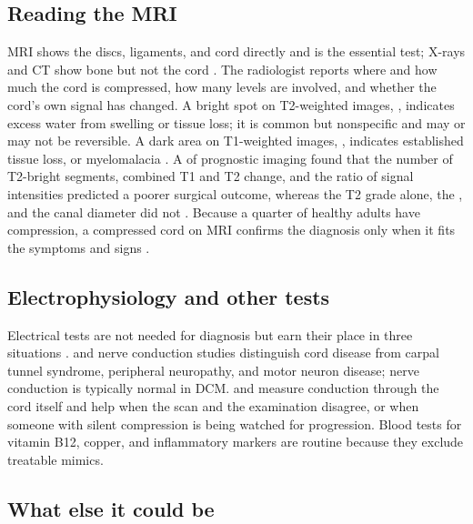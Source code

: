 \documentclass[11pt, letterpaper]{article}
\begin{document}
\subsection*{Reading the MRI}

MRI shows the discs, ligaments, and cord directly and is the essential test; X-rays and CT show bone but not the cord \citep{davies2018}. The radiologist reports where and how much the cord is compressed, how many levels are involved, and whether the cord's own signal has changed. A bright spot on T2-weighted images, , indicates excess water from swelling or tissue loss; it is common but nonspecific and may or may not be reversible. A dark area on T1-weighted images, , indicates established tissue loss, or \gls{myelomalacia} \citep{tetreault2022}. A  of prognostic imaging found that the number of T2-bright segments, combined T1 and T2 change, and the ratio of signal intensities predicted a poorer surgical outcome, whereas the T2 grade alone, the , and the canal diameter did not \citep{tetreault2013mri}. Because a quarter of healthy adults have compression, a compressed cord on MRI confirms the diagnosis only when it fits the symptoms and signs \citep{tetreault2022}.

\subsection*{Electrophysiology and other tests}

Electrical tests are not needed for diagnosis but earn their place in three situations \citep{tetreault2022}.  and nerve conduction studies distinguish cord disease from carpal tunnel syndrome, peripheral neuropathy, and motor neuron disease; nerve conduction is typically normal in DCM.  and  measure conduction through the cord itself and help when the scan and the examination disagree, or when someone with silent compression is being watched for progression. Blood tests for vitamin B12, copper, and inflammatory markers are routine because they exclude treatable mimics.

\subsection*{What else it could be}
\end{document}
